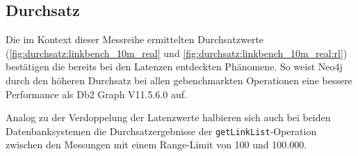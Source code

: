 \begin{table}[!ht]
\centering
{}
\caption{Latenz Linkbench-10M-Real Neo4j getLinkList}
\label{tab:latenz_10m_real:neo4j:gll}
\end{table}

\subsection{Durchsatz}
Die im Kontext dieser Messreihe ermittelten Durchsatzwerte (\autoref{fig:durchsatz:linkbench_10m_real} und \autoref{fig:durchsatz:linkbench_10m_real:rl}) bestätigen die bereits bei den Latenzen entdeckten Phänomene. So weist Neo4j durch den höheren Durchsatz bei allen gebenchmarkten Operationen eine bessere Performance als Db2 Graph V11.5.6.0 auf. 

Analog zu der Verdoppelung der Latenzwerte halbieren sich auch bei beiden Datenbanksystemen die Durchsatzergebnisse der \texttt{getLinkList}-Operation zwischen den Messungen mit einem Range-Limit von 100 und 100.000.

